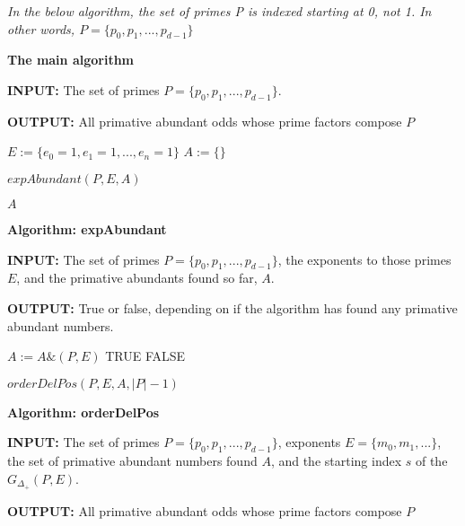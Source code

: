 \documentclass[../paper.tex]{subfiles}
\begin{document}

\textit{In the below algorithm, the set of primes P is indexed 
starting at 0, not 1. In other words, $P = \{p_0, p_1, ..., p_{d-1}\}$}



{\setlength{\parindent}{0cm}

\textbf{The main algorithm}

\textbf{INPUT:} The set of primes 
$P = \{p_0, p_1, ..., p_{d-1}\}$.

\textbf{OUTPUT:} All primative abundant odds whose prime factors
compose $P$

}


\begin{algorithmic}

\STATE $E := \{e_0 = 1,e_1 = 1,...,e_n = 1\}$
\STATE $A := \{ \}$ %

\STATE $expAbundant(P, E, A)$

\RETURN $A$

\end{algorithmic}

{\setlength{\parindent}{0cm}

\textbf{Algorithm: expAbundant}

\textbf{INPUT:} The set of primes 
$P = \{p_0, p_1, ..., p_{d-1}\}$, the exponents to those 
primes $E$, and the primative abundants found so far, $A$.

\textbf{OUTPUT:} True or false, depending on if the algorithm has found any
primative abundant numbers.

}

\begin{algorithmic}
		\STATE $A := A \& (P,E)$
		\RETURN TRUE
	\ENDIF
	\RETURN FALSE
\ENDIF

\RETURN $orderDelPos(P,E,A,|P| - 1)$

\end{algorithmic}

{\setlength{\parindent}{0cm}

\textbf{Algorithm: orderDelPos}

\textbf{INPUT:} The set of primes 
$P = \{p_0, p_1, ..., p_{d-1}\}$, exponents $E = \{ m_0, m_1,
...\}$, the set of primative abundant numbers found $A$,
and the starting index $s$ of the $G_{\Delta_{+}}(P,E)$.

\textbf{OUTPUT:} All primative abundant odds whose prime factors
compose $P$

}
\end{document}
